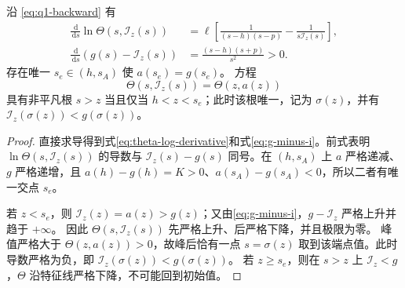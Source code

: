 \documentclass[lang=cn,a4paper,newtx]{elegantpaper}
\theoremstyle{plain}
\theoremstyle{definition}
\newcommand{\dd}{\,\mathrm d}
\begin{document}
\begin{lemma}[单峰性及非平凡根的参数域]
\label{lem:unimodal}
沿 \eqref{eq:q1-backward} 有
\begin{align}
\frac{\dd}{\dd s}\ln\Theta(s,\mathcal I_z(s))
&=\ell\left[\frac1{(s-h)(s-p)}-\frac1{s\mathcal I_z(s)}\right],
\label{eq:theta-log-derivative}\\
\frac{\dd}{\dd s}(g(s)-\mathcal I_z(s))
&=\frac{(s-h)(s+p)}{s^2}>0.
\label{eq:g-minus-i}
\end{align}
存在唯一 $s_e\in(h,s_A)$ 使 $a(s_e)=g(s_e)$。
方程
\begin{equation}
\Theta(s,\mathcal I_z(s))=\Theta(z,a(z))
\label{eq:switch-condition}
\end{equation}
具有非平凡根 $s>z$ 当且仅当 $h<z<s_e$；此时该根唯一，记为 $\sigma(z)$，并有
$\mathcal I_z(\sigma(z))<g(\sigma(z))$。
\end{lemma}
\begin{proof}
直接求导得到式\eqref{eq:theta-log-derivative}和式\eqref{eq:g-minus-i}。前式表明 $\ln\Theta(s,\mathcal I_z(s))$ 的导数与 $\mathcal I_z(s)-g(s)$ 同号。在 $(h,s_A)$ 上 $a$ 严格递减、$g$ 严格递增，且 $a(h)-g(h)=K>0$、$a(s_A)-g(s_A)<0$，所以二者有唯一交点 $s_e$。

若 $z<s_e$，则 $\mathcal I_z(z)=a(z)>g(z)$；又由\eqref{eq:g-minus-i}，$g-\mathcal I_z$ 严格上升并趋于 $+\infty$。
因此 $\Theta(s,\mathcal I_z(s))$ 先严格上升、后严格下降，并且极限为零。
峰值严格大于 $\Theta(z,a(z))>0$，故峰后恰有一点 $s=\sigma(z)$ 取到该端点值。此时导数严格为负，即 $\mathcal I_z(\sigma(z))<g(\sigma(z))$。
若 $z\ge s_e$，则在 $s>z$ 上 $\mathcal I_z<g$，$\Theta$ 沿特征线严格下降，不可能回到初始值。
\end{proof}
\end{document}
